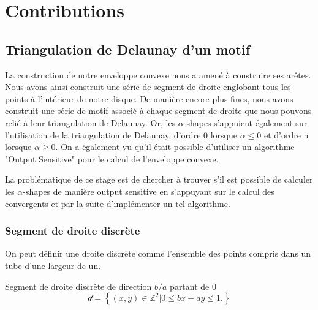 \section{Contributions}

\subsection{Triangulation de Delaunay d'un motif}


La construction de notre enveloppe convexe nous a amené à construire ses arêtes. Nous avons ainsi construit une série de segment de droite englobant tous les points à l'intérieur de notre disque. De manière encore plus fines, nous avons construit une série de motif associé à chaque segment de droite que nous pouvons relié à leur triangulation de Delaunay. Or, les $\alpha$-shapes s’appuient également sur l'utilisation de la triangulation de Delaunay, d'ordre 0 lorsque $\alpha \leq 0$ et d'ordre n lorsque $\alpha \geq 0$. On a également vu qu'il était possible d'utiliser un algorithme "Output Sensitive" pour le calcul de l'enveloppe convexe.

La problématique de ce stage est de chercher à trouver s'il est possible de calculer les $\alpha$-shapes de manière output sensitive en s'appuyant sur le calcul des convergents et par la suite d'implémenter un tel algorithme.  



\subsubsection{Segment de droite discrète}

On peut définir une droite discrète comme l'ensemble des points compris dans un tube d'une largeur de un.

\begin{Definition}{Segment de droite discrète de direction $b / a$ partant de $0$}
\label{def:sdd}
    $$\mathcal{d} =  \left\{ (x,y) \in \mathbb{Z}^{2} |  0 \leq b x + a y \leq 1. \right\}$$
\end{Definition}


